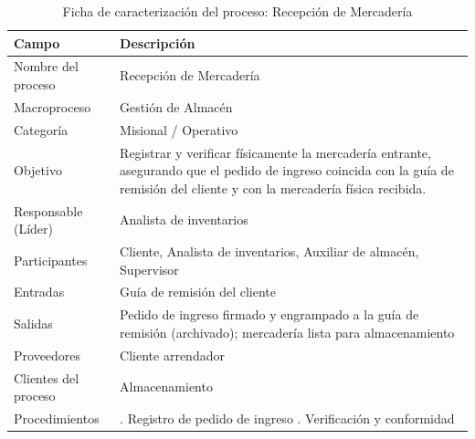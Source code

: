 \documentclass[11pt, a4paper, oneside]{report}
\begin{document}
\begin{table}[H]
\centering\small
\renewcommand{\arraystretch}{1.35}
\setlength{\tabcolsep}{6pt}
\begin{tabularx}{\textwidth}{|>{\raggedright\arraybackslash}p{}|>{\raggedright\arraybackslash}X|}
\hline
\rowcolor{upeu_dark}
\color{white}\bfseries Campo & \color{white}\bfseries Descripción \\ \hline
\rowcolor{gray!10}
Nombre del proceso & Recepción de Mercadería \\ \hline
Macroproceso & Gestión de Almacén \\ \hline
\rowcolor{gray!10}
Categoría & Misional / Operativo \\ \hline
Objetivo & Registrar y verificar físicamente la mercadería entrante, asegurando que el pedido de ingreso coincida con la guía de remisión del cliente y con la mercadería física recibida. \\ \hline
\rowcolor{gray!10}
Responsable (Líder) & Analista de inventarios \\ \hline
Participantes & Cliente, Analista de inventarios, Auxiliar de almacén, Supervisor \\ \hline
\rowcolor{gray!10}
Entradas & Guía de remisión del cliente \\ \hline
Salidas & Pedido de ingreso firmado y engrampado a la guía de remisión (archivado); mercadería lista para almacenamiento \\ \hline
\rowcolor{gray!10}
Proveedores & Cliente arrendador \\ \hline
Clientes del proceso & Almacenamiento \\ \hline
\rowcolor{gray!10}
Procedimientos & 1. Registro de pedido de ingreso \newline 2. Verificación y conformidad \\ \hline
\end{tabularx}
\caption{Ficha de caracterización del proceso: Recepción de Mercadería}
\end{table}
\end{document}
